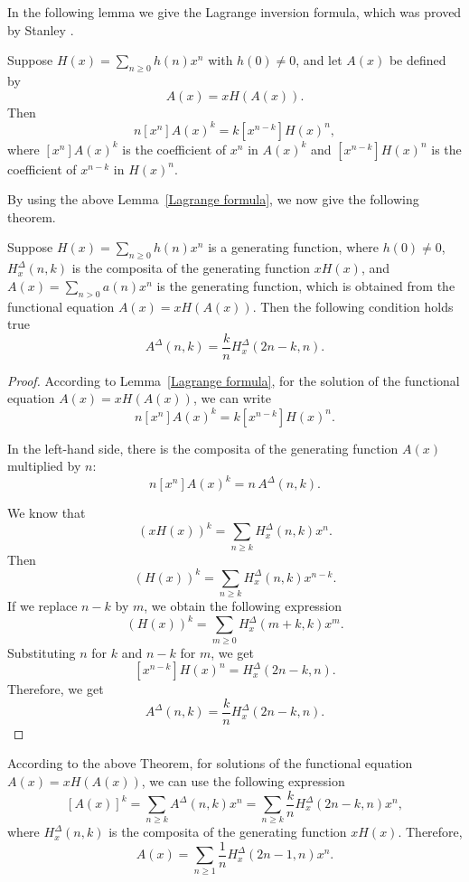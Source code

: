 \documentclass[12pt]{article}
\begin{document}
In the following lemma we give the Lagrange inversion formula, which was proved by Stanley \cite{Stanley_v2}.

\begin{lemma}
\label{Lagrange formula}
Suppose $H(x)=\sum_{n\geq 0}h(n)x^n$ with $h(0)\neq 0$, and let $A(x)$ be defined by
\begin{equation}
\label{funcEq}
A(x)=xH(A(x)).
\end{equation}
Then
\begin{equation}
n[x^n]A(x)^k=k[x^{n-k}]H(x)^n,
\end{equation}
where $[x^n]A(x)^k$ is the coefficient of $x^n$ in  $A(x)^k$ and  $[x^{n-k}]H(x)^n$ is the coefficient of $x^{n-k}$ in  $H(x)^n$.
\end{lemma}

By using the above Lemma~\ref{Lagrange formula}, we now give the following theorem.

\begin{theorem}
\label{thm1} 
Suppose  $H(x)=\sum_{n\geq 0}h(n)x^n$ is a generating function, where $h(0)\neq 0$, $H_x^{\Delta}(n,k)$ is the composita of the generating function $xH(x)$, and $A(x)=\sum_{n>0}a(n)x^n$ is the generating function, which is obtained from the functional equation $A(x)=xH(A(x))$. Then the following condition holds true
\begin{equation}\label{LagrangeCompozita}
A^{\Delta}(n,k)=\frac{k}{n}H_x^{\Delta}(2n-k,n).
\end{equation}
\end{theorem}
\begin{proof} According to Lemma~\ref{Lagrange formula}, for the solution of the functional equation $A(x)=xH(A(x))$, we can write
$$
n[x^n]A(x)^k=k[x^{n-k}]H(x)^n.
$$

In the left-hand side, there is the composita of the generating function $A(x)$ multiplied by $n$:
$$
n[x^n]A(x)^k=n\,A^{\Delta}(n,k).
$$

We know that
$$
\left( xH(x)\right)^k=\sum_{n\geq k}H_x^{\Delta}(n,k)x^n.
$$
Then
$$
\left( H(x)\right)^k=\sum_{n\geq k}H_x^{\Delta}(n,k)x^{n-k}.
$$
If we replace $n-k$ by $m$, we obtain the following expression
$$
\left( H(x)\right)^k=\sum_{m\geq 0}H_x^{\Delta}(m+k,k)x^{m}.
$$
Substituting $n$ for $k$ and $n-k$ for $m$, we get
$$
[x^{n-k}]H(x)^n=H_x^{\Delta}(2n-k,n).
$$
Therefore, we get
$$
A^{\Delta}(n,k)=\frac{k}{n}H_x^{\Delta}(2n-k,n).
$$
\end{proof}

According to the above Theorem, for solutions of the functional equation $A(x)=xH(A(x))$, we can use the following expression
$$
[A(x)]^k=\sum_{n\geq k}A^{\Delta}(n,k)x^n=\sum_{n\geq k} \frac{k}{n}H_x^{\Delta}(2n-k,n)x^n,
$$
where $H_x^{\Delta}(n,k)$ is the composita of the generating function $xH(x)$.
Therefore,
\begin{equation}
A(x)=\sum_{n\geq 1} \frac{1}{n}H_x^{\Delta}(2n-1,n)x^n.
\label{solvEq1}
\end{equation}
\end{document}
